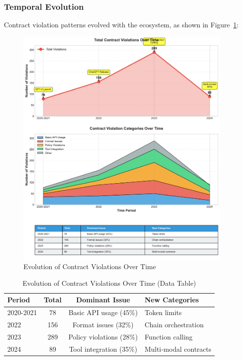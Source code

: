 \documentclass[11pt]{article}
\begin{document}
\subsubsection{Temporal Evolution}

Contract violation patterns evolved with the ecosystem, as shown in Figure~\ref{fig:temporal_evolution}:

\begin{figure}[h]
\centering
\includegraphics[width=0.95\textwidth]{fig7_evolution_over_time.pdf}
\caption{Evolution of Contract Violations Over Time}
\label{fig:temporal_evolution}
\end{figure}

\begin{table}[h]
\centering
\caption{Evolution of Contract Violations Over Time (Data Table)}
\label{tab:temporal_evolution}
\begin{tabular}{lccl}
\toprule
\textbf{Period} & \textbf{Total} & \textbf{Dominant Issue} & \textbf{New Categories} \\
\midrule
2020-2021 & 78 & Basic API usage (45\%) & Token limits \\
2022 & 156 & Format issues (32\%) & Chain orchestration \\
2023 & 289 & Policy violations (28\%) & Function calling \\
2024 & 89 & Tool integration (35\%) & Multi-modal contracts \\
\bottomrule
\end{tabular}
\end{table}
\end{document}
